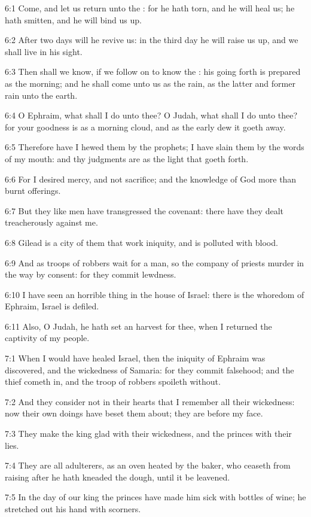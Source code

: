 6:1 Come, and let us return unto the \LORD: for he hath torn, and he
will heal us; he hath smitten, and he will bind us up.

6:2 After two days will he revive us: in the third day he will raise
us up, and we shall live in his sight.

6:3 Then shall we know, if we follow on to know the \LORD: his going
forth is prepared as the morning; and he shall come unto us as the
rain, as the latter and former rain unto the earth.

6:4 O Ephraim, what shall I do unto thee? O Judah, what shall I do
unto thee? for your goodness is as a morning cloud, and as the early
dew it goeth away.

6:5 Therefore have I hewed them by the prophets; I have slain them by
the words of my mouth: and thy judgments are as the light that goeth
forth.

6:6 For I desired mercy, and not sacrifice; and the knowledge of God
more than burnt offerings.

6:7 But they like men have transgressed the covenant: there have they
dealt treacherously against me.

6:8 Gilead is a city of them that work iniquity, and is polluted with
blood.

6:9 And as troops of robbers wait for a man, so the company of priests
murder in the way by consent: for they commit lewdness.

6:10 I have seen an horrible thing in the house of Israel: there is
the whoredom of Ephraim, Israel is defiled.

6:11 Also, O Judah, he hath set an harvest for thee, when I returned
the captivity of my people.

7:1 When I would have healed Israel, then the iniquity of Ephraim was
discovered, and the wickedness of Samaria: for they commit falsehood;
and the thief cometh in, and the troop of robbers spoileth without.

7:2 And they consider not in their hearts that I remember all their
wickedness: now their own doings have beset them about; they are
before my face.

7:3 They make the king glad with their wickedness, and the princes
with their lies.

7:4 They are all adulterers, as an oven heated by the baker, who
ceaseth from raising after he hath kneaded the dough, until it be
leavened.

7:5 In the day of our king the princes have made him sick with bottles
of wine; he stretched out his hand with scorners.

